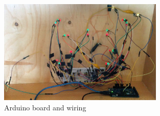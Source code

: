 \begin{figure}[H]\label{fig:ardhazard}
  \centering
    \includegraphics[width=0.7\textwidth]{../common/images/arduinowiring.jpg}
    \caption{Arduino board and wiring}
\end{figure}